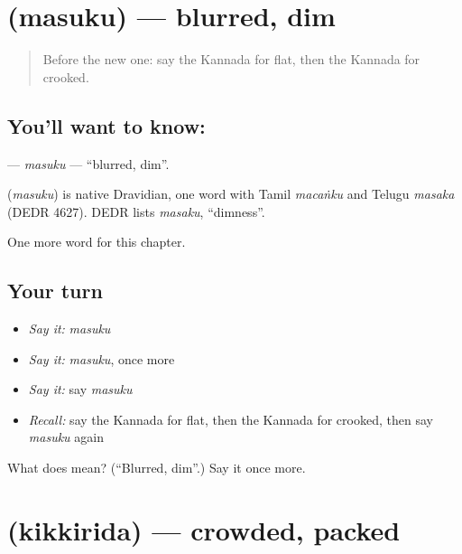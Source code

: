 \section[\texorpdfstring{\kn{ಮಸುಕು} (masuku)}{ಮಸುಕು (masuku)}]{ (masuku) — blurred, dim}

\label{lesson:KA-C256-masuku}



\begin{quote}
Before the new one: say the Kannada for flat, then the Kannada for crooked.
\end{quote}

\subsection*{You'll want to know: }
\textbf{} — \emph{masuku} — \textquotedblleft{}blurred, dim\textquotedblright{}.

\begin{cousinweb}
\textbf{} (\emph{masuku}) is native Dravidian, one word with Tamil \emph{macaṅku} and Telugu \emph{masaka} (DEDR 4627). DEDR lists \emph{masaku}, \textquotedblleft{}dimness\textquotedblright{}.
\end{cousinweb}

\begin{grammarlens}[title={What you've built}]
One more word for this chapter.
\end{grammarlens}

\subsection*{Your turn}
\begin{itemize}
\raggedright
  \item \emph{Say it:} \emph{masuku}
  \item \emph{Say it:} \emph{masuku}, once more
  \item \emph{Say it:} say \emph{masuku}
  \item \emph{Recall:} say the Kannada for flat, then the Kannada for crooked, then say \emph{masuku} again
\end{itemize}

\begin{tcolorbox}[breakable,colback=teal!4,colframe=teal!35!black,title={Before you move on}]
What does  mean? (\textquotedblleft{}Blurred, dim\textquotedblright{}.) Say it once more.
\end{tcolorbox}
\section[\texorpdfstring{\kn{ಕಿಕ್ಕಿರಿದ} (kikkirida)}{ಕಿಕ್ಕಿರಿದ (kikkirida)}]{ (kikkirida) — crowded, packed}

